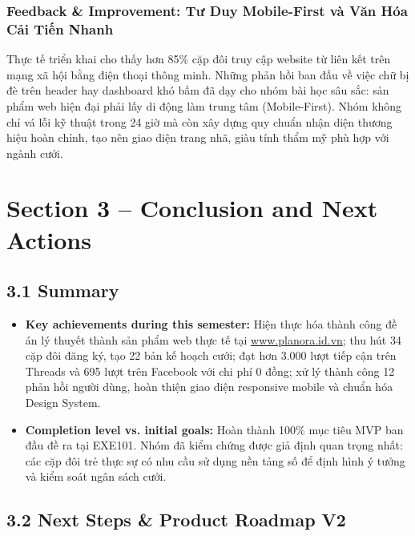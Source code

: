 \documentclass[11pt]{article}
\begin{document}
\subsubsection*{Feedback \& Improvement: Tư Duy Mobile-First và Văn Hóa Cải Tiến Nhanh}
Thực tế triển khai cho thấy hơn 85\% cặp đôi truy cập website từ liên kết trên mạng xã hội bằng điện thoại thông minh. Những phản hồi ban đầu về việc chữ bị đè trên header hay dashboard khó bấm đã dạy cho nhóm bài học sâu sắc: sản phẩm web hiện đại phải lấy di động làm trung tâm (Mobile-First). Nhóm không chỉ vá lỗi kỹ thuật trong 24 giờ mà còn xây dựng quy chuẩn nhận diện thương hiệu hoàn chỉnh, tạo nên giao diện trang nhã, giàu tính thẩm mỹ phù hợp với ngành cưới.

\section*{Section 3 -- Conclusion and Next Actions}

\subsection*{3.1 Summary}

\begin{itemize}
    \item \textbf{Key achievements during this semester:} Hiện thực hóa thành công đề án lý thuyết thành sản phẩm web thực tế tại \href{https://www.planora.id.vn}{www.planora.id.vn}; thu hút 34 cặp đôi đăng ký, tạo 22 bản kế hoạch cưới; đạt hơn 3.000 lượt tiếp cận trên Threads và 695 lượt trên Facebook với chi phí 0 đồng; xử lý thành công 12 phản hồi người dùng, hoàn thiện giao diện responsive mobile và chuẩn hóa Design System.
    \item \textbf{Completion level vs. initial goals:} Hoàn thành 100\% mục tiêu MVP ban đầu đề ra tại EXE101. Nhóm đã kiểm chứng được giả định quan trọng nhất: các cặp đôi trẻ thực sự có nhu cầu sử dụng nền tảng số để định hình ý tưởng và kiểm soát ngân sách cưới.
\end{itemize}

\subsection*{3.2 Next Steps \& Product Roadmap V2}
\end{document}

